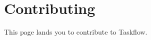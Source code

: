 \chapter{Contributing}
\hypertarget{_contributing}{}\label{_contributing}
This page lands you to contribute to Taskflow.


\begin{DoxyItemize}
\item {}
\item {} 
\end{DoxyItemize}

